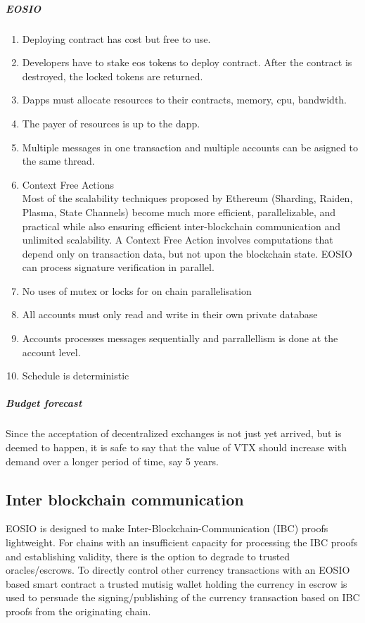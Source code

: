 \documentclass[]{article}
\begin{document}
\subparagraph{EOSIO}

\begin{enumerate}
\item Deploying contract has cost but free to use. 
\item Developers have to stake eos tokens to deploy contract.
After the contract is destroyed, the locked tokens are returned.
\item Dapps must allocate resources to their contracts, memory, cpu, bandwidth. 
\item The payer of resources is up to the dapp.
\item Multiple messages in one transaction and multiple accounts can be asigned to the same thread.
\item Context Free Actions \\
Most of the scalability techniques proposed by Ethereum (Sharding, Raiden, Plasma, State Channels) become much more efficient, parallelizable, and practical while also ensuring efficient inter-blockchain communication and unlimited scalability.
A Context Free Action involves computations that depend only on transaction data, but not upon the blockchain state. 
EOSIO can process signature verification in parallel.

\item No uses of mutex or locks for on chain parallelisation
\item All accounts must only read and write in their own private database
\item Accounts processes messages sequentially and  parrallellism is done at the account level.
\item Schedule is deterministic
\end{enumerate}

\subparagraph{Budget forecast}
Since the acceptation of decentralized exchanges is not just yet arrived,
but is deemed to happen, it is safe to say that the value of VTX should increase with demand over a longer period of time, say 5 years.

\subsection{Inter blockchain communication}
EOSIO is designed to make Inter-Blockchain-Communication (IBC) proofs lightweight. 
For chains with an insufficient capacity for processing the  IBC proofs and establishing validity, 
there is the option to degrade to trusted oracles/escrows.
To directly control other currency transactions with an
EOSIO based smart contract a trusted mutisig wallet holding the currency 
in escrow is used to persuade the signing/publishing of the currency 
transaction based on IBC proofs from the originating chain.	
\end{document}
